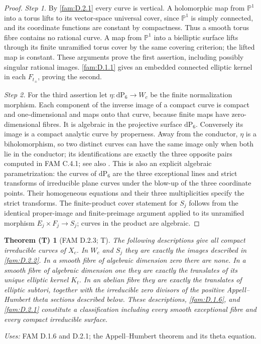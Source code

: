 \documentclass[11pt,a4paper]{article}
\theoremstyle{plain}
\newtheorem{theorem}{Theorem (T)}[section]
\theoremstyle{definition}
\begin{document}
\begin{proof}
\par\noindent\textit{Step 1.} By \ref{fam:D.2.1} every curve is vertical. A holomorphic map from
\(\mathbb P^1\) into a torus lifts to its vector-space universal cover,
since \(\mathbb P^1\) is simply connected, and its coordinate functions
are constant by compactness. Thus a smooth torus fibre contains no
rational curve. A map from \(\mathbb P^1\) into a bielliptic surface
lifts through its finite unramified torus cover by the same covering
criterion; the lifted map is constant. These arguments prove the first
assertion, including possibly singular rational images.
\ref{fam:D.1.1} gives an embedded connected elliptic kernel in each \(F_{t_\pm}\),
proving the second.

\par\noindent\textit{Step 2.} For the third assertion let \(\eta:\mathrm{dP}_6\to W_c\) be the finite
normalization morphism. Each component of the inverse image of a compact
curve is compact and one-dimensional and maps onto that curve, because
finite maps have zero-dimensional fibres. It is algebraic in the
projective surface \(\mathrm{dP}_6\). Conversely its image is a compact
analytic curve by properness. Away from the conductor, \(\eta\) is a
biholomorphism, so two distinct curves can have the same image only when
both lie in the conductor; its identifications are exactly the three
opposite pairs computed in FAM C.4.1; see also \cite[\S4.6, Proposition~4.6]{AC26}. This is also an explicit algebraic
parametrization: the curves of \(\mathrm{dP}_6\) are the three exceptional
lines and strict transforms of irreducible plane curves under the blow-up
of the three coordinate points. Their homogeneous equations and their
three multiplicities specify the strict transforms. The finite-product
cover statement for \(S_j\) follows from the identical proper-image and
finite-preimage argument applied to its unramified morphism
\(E_j\times F_j\to S_j\); curves in the product are algebraic.
\end{proof}

\begin{theorem}[FAM D.2.3; T]\label{fam:D.2.3}
The following descriptions give all compact irreducible curves of $X_c$.
In $W_c$ and $S_j$ they are exactly the images described in \ref{fam:D.2.2}.
In a smooth fibre of algebraic dimension zero there are none. In a
smooth fibre of algebraic dimension one they are exactly the translates
of its unique elliptic kernel $K_t$. In an abelian fibre they are exactly
the translates of elliptic subtori, together with the irreducible zero
divisors of the positive Appell--Humbert theta sections described below.
These descriptions, \ref{fam:D.1.6}, and \ref{fam:D.2.1} constitute a classification including
every smooth exceptional fibre and every compact irreducible surface.
\end{theorem}
\noindent\emph{Uses:} FAM D.1.6 and D.2.1; the Appell--Humbert theorem and its theta equation.\par
\end{document}
